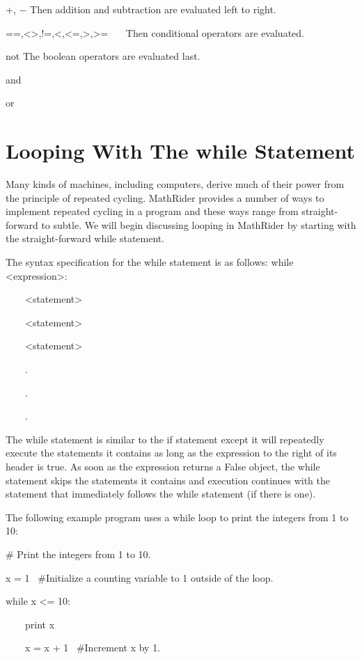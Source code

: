 \documentclass[12pt,oneside]{book}
\begin{document}
+, $-$ Then addition and subtraction are evaluated left to right.


==,{\textless}{\textgreater},!=,{\textless},{\textless}=,{\textgreater},{\textgreater}= \ \ \ Then conditional operators are evaluated.


not The boolean operators are evaluated last.


and 


or 

\section[Looping With The while Statement]{Looping With The while Statement}

Many kinds of machines, including computers, derive much of their power from the principle of repeated cycling. MathRider provides a number of ways to implement repeated cycling in a program and these ways range from straight{}-forward to subtle. We will begin discussing looping in MathRider by starting with the straight{}-forward while statement. 

The syntax specification for the while statement is as follows:
while {\textless}expression{\textgreater}:

\ \ \ \ {\textless}statement{\textgreater}

\ \ \ \ {\textless}statement{\textgreater}

\ \ \ \ {\textless}statement{\textgreater}

\ \ \ \ .

\ \ \ \ .

\ \ \ \ .


The while statement is similar to the if statement except it will repeatedly execute the statements it contains as long as the expression to the right of its header is true. As soon as the expression returns a False object, the while statement skips the statements it contains and execution continues with the statement that immediately follows the while statement (if there is one).  

The following example program uses a while loop to print the integers from 1 to 10:


\# Print the integers from 1 to 10.


x = 1 \ \#Initialize a counting variable to 1 outside of the loop.


while x {\textless}= 10:

\ \ \ \ print x

\ \ \ \ x = x + 1 \ \#Increment x by 1.
\end{document}
